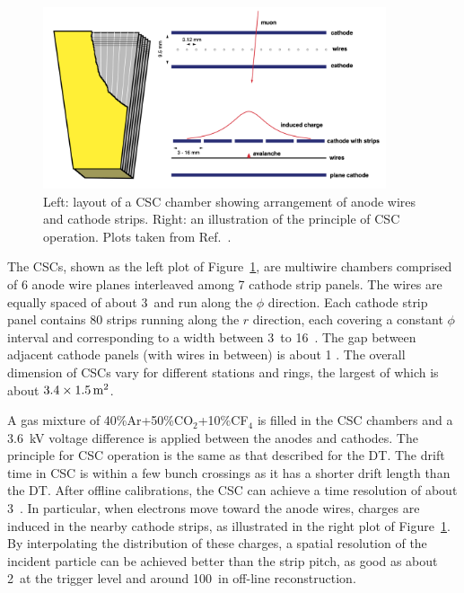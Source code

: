 \begin{figure}[!htb]
    \centering
    \captionsetup{justification=justified}
    \includegraphics[width=0.90\textwidth]{pics/LHC_CMS/CSC.png}
    \caption{Left: layout of a CSC chamber showing arrangement of anode wires and cathode strips.
             Right: an illustration of the principle of CSC operation.
             Plots taken from Ref.~\cite{collaboration_2013}.}
    \label{fig:cms_csc}
\end{figure}

The CSCs, shown as the left plot of Figure~\ref{fig:cms_csc}, are multiwire chambers comprised of 6 anode wire planes interleaved among 7 cathode strip panels.
The wires are equally spaced of about 3~\mm and run along the $\phi$ direction.  
Each cathode strip panel contains 80 strips running along the $r$ direction, each covering a constant $\phi$ interval and corresponding to a width between 3~\mm to 16~\mm. 
The gap between adjacent cathode panels (with wires in between) is about 1 \cm.  
The overall dimension of CSCs vary for different stations and rings, the largest of which is about $3.4 \times 1.5 \meter^{2}$.

A gas mixture of 40\%Ar+50\%CO$_{2}$+10\%CF$_{4}$ is filled in the CSC chambers and 
a 3.6~kV voltage difference is applied between the anodes and cathodes.
The principle for CSC operation is the same as that described for the DT.
The drift time in CSC is within a few bunch crossings as it has a shorter drift length than the DT.
After offline calibrations, the CSC can achieve a time resolution of about 3~\ns.
In particular, when electrons move toward the anode wires, charges are induced in the nearby cathode strips, as illustrated in the right plot of Figure~\ref{fig:cms_csc}.
By interpolating the distribution of these charges, a spatial resolution of the incident particle can be achieved better than the strip pitch,
as good as about 2~\mm at the trigger level and around 100~\mum in off-line reconstruction.  

